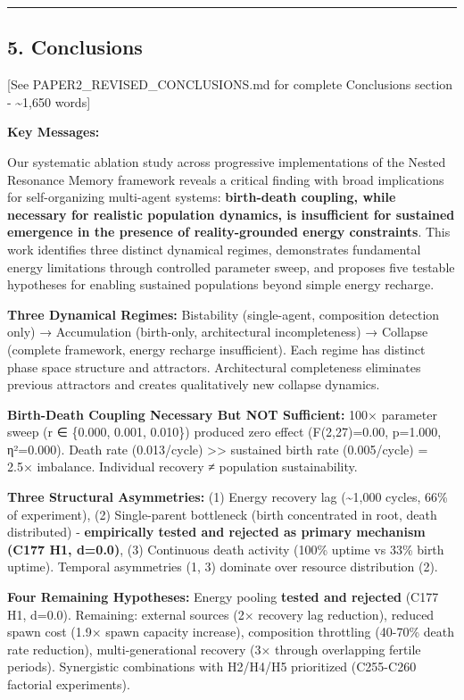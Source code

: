 \documentclass[
]{article}
\begin{document}
\begin{center}\rule{0.5\linewidth}{0.5pt}\end{center}

\subsection{5. Conclusions}\label{conclusions}

{[}See PAPER2\_REVISED\_CONCLUSIONS.md for complete Conclusions section
- \textasciitilde1,650 words{]}

\textbf{Key Messages:}

Our systematic ablation study across progressive implementations of the
Nested Resonance Memory framework reveals a critical finding with broad
implications for self-organizing multi-agent systems:
\textbf{birth-death coupling, while necessary for realistic population
dynamics, is insufficient for sustained emergence in the presence of
reality-grounded energy constraints}. This work identifies three
distinct dynamical regimes, demonstrates fundamental energy limitations
through controlled parameter sweep, and proposes five testable
hypotheses for enabling sustained populations beyond simple energy
recharge.

\textbf{Three Dynamical Regimes:} Bistability (single-agent, composition
detection only) → Accumulation (birth-only, architectural
incompleteness) → Collapse (complete framework, energy recharge
insufficient). Each regime has distinct phase space structure and
attractors. Architectural completeness eliminates previous attractors
and creates qualitatively new collapse dynamics.

\textbf{Birth-Death Coupling Necessary But NOT Sufficient:} 100×
parameter sweep (r ∈ \{0.000, 0.001, 0.010\}) produced zero effect
(F(2,27)=0.00, p=1.000, η²=0.000). Death rate (0.013/cycle)
\textgreater\textgreater{} sustained birth rate (0.005/cycle) = 2.5×
imbalance. Individual recovery ≠ population sustainability.

\textbf{Three Structural Asymmetries:} (1) Energy recovery lag
(\textasciitilde1,000 cycles, 66\% of experiment), (2) Single-parent
bottleneck (birth concentrated in root, death distributed) -
\textbf{empirically tested and rejected as primary mechanism (C177 H1,
d=0.0)}, (3) Continuous death activity (100\% uptime vs 33\% birth
uptime). Temporal asymmetries (1, 3) dominate over resource distribution
(2).

\textbf{Four Remaining Hypotheses:} Energy pooling \textbf{tested and
rejected} (C177 H1, d=0.0). Remaining: external sources (2× recovery lag
reduction), reduced spawn cost (1.9× spawn capacity increase),
composition throttling (40-70\% death rate reduction),
multi-generational recovery (3× through overlapping fertile periods).
Synergistic combinations with H2/H4/H5 prioritized (C255-C260 factorial
experiments).
\end{document}
